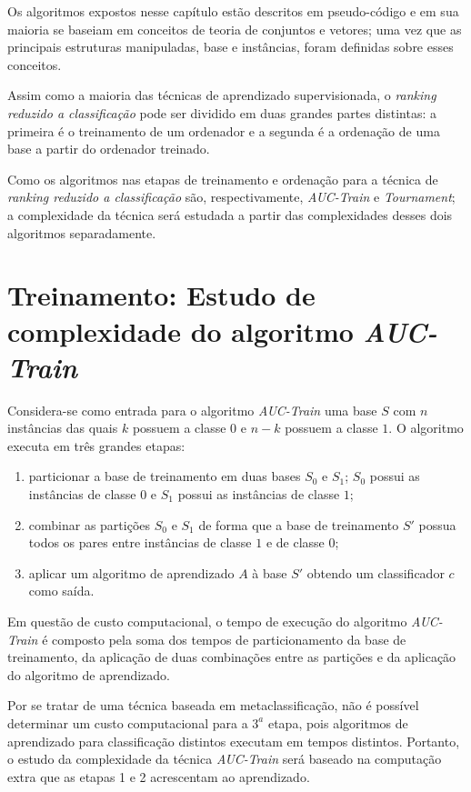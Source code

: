 Os algoritmos expostos nesse capítulo estão descritos em pseudo-código e em sua maioria se baseiam em conceitos de teoria de conjuntos e vetores; uma vez que as principais estruturas manipuladas, base e instâncias, foram definidas sobre esses conceitos.

Assim como a maioria das técnicas de aprendizado supervisionada, o \emph{ranking reduzido a classificação} pode ser dividido em duas grandes partes distintas: a primeira é o treinamento de um ordenador e a segunda é a ordenação de uma base a partir do ordenador treinado.

Como os algoritmos nas etapas de treinamento e ordenação para a técnica de \emph{ranking reduzido a classificação} são, respectivamente, \emph{AUC-Train} e \emph{Tournament}; a complexidade da técnica será estudada a partir das complexidades desses dois algoritmos separadamente.


\section{Treinamento: Estudo de complexidade do algoritmo \emph{AUC-Train}}

Considera-se como entrada para o algoritmo \emph{AUC-Train} uma base $S$ com $n$ instâncias das quais $k$ possuem a classe $0$ e $n - k$ possuem a classe $1$. O algoritmo executa em três grandes etapas:

\begin{enumerate}
    \item particionar a base de treinamento em duas bases $S_0$ e $S_1$; $S_0$ possui as instâncias de classe $0$ e $S_1$ possui as instâncias de classe $1$;
    \item combinar as partições $S_0$ e $S_1$ de forma que a base de treinamento $S'$ possua todos os pares entre instâncias de classe $1$ e de classe $0$;
    \item aplicar um algoritmo de aprendizado $A$ à base $S'$ obtendo um classificador $c$ como saída.
\end{enumerate}

Em questão de custo computacional, o tempo de execução do algoritmo \emph{AUC-Train} é composto pela soma dos tempos de particionamento da base de treinamento, da aplicação de duas combinações entre as partições e da aplicação do algoritmo de aprendizado.

Por se tratar de uma técnica baseada em metaclassificação, não é possível determinar um custo computacional para a $3^a$ etapa, pois algoritmos de aprendizado para classificação distintos executam em tempos distintos. Portanto, o estudo da complexidade da técnica \emph{AUC-Train} será baseado na computação extra que as etapas 1 e 2 acrescentam ao aprendizado.

